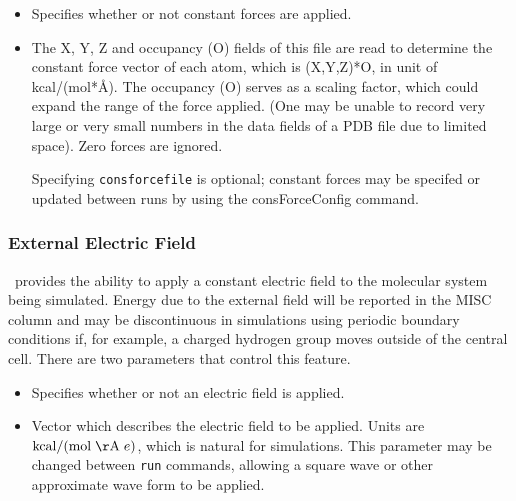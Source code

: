 \begin{itemize}

\item
{}
{Specifies whether or not constant forces are applied.}

\item
{}
{
The X, Y, Z and occupancy (O) fields of this file are read to
determine the constant force vector of each atom, which is
(X,Y,Z)*O, in unit of kcal/(mol*\AA). The occupancy (O) serves as
a scaling factor, which could expand the range of the force
applied. (One may be unable to record very large or very small
numbers in the data fields of a PDB file due to limited space).
Zero forces are ignored.

Specifying {\tt consforcefile} is optional; constant forces may be specifed
or updated between runs by using the consForceConfig command.
}

\end{itemize}


\subsubsection{External Electric Field}

\PDAC\ provides the ability to apply a constant electric field to the molecular
system being simulated.
Energy due to the external field will be reported in the MISC column
and may be discontinuous in simulations using periodic boundary conditions if,
for example, a charged hydrogen group moves outside of the central cell.
There are two parameters that control this feature.

\begin{itemize}

\item
{}
{Specifies whether or not an electric field is applied.}

\item
{}
{Vector which describes the electric field to be applied.
Units are ${\rm kcal} / ({\rm mol \; \AA} \; e)$, which is natural for simulations.
This parameter may be changed between {\tt run} commands, allowing a square
wave or other approximate wave form to be applied.}

\end{itemize}


